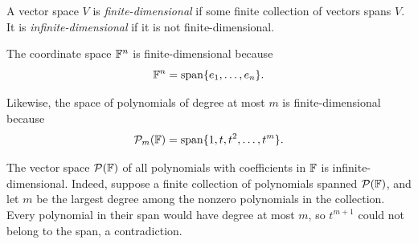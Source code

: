 \begin{definition}
  A vector space $V$ is \emph{finite-dimensional} if some finite
  collection of vectors spans $V$. It is \emph{infinite-dimensional}
  if it is not finite-dimensional.
\end{definition}

\begin{example}
  The coordinate space $\mathbb{F}^n$ is finite-dimensional because
  \[
    \mathbb{F}^n=\operatorname{span}\{e_1,\ldots,e_n\}.
  \]

  Likewise, the space of polynomials of degree at most $m$ is
  finite-dimensional because
  \[
    \mathcal P_m(\mathbb{F})
    =\operatorname{span}\{1,t,t^2,\ldots,t^m\}.
  \]
\end{example}

\begin{example}
  The vector space $\mathcal P(\mathbb{F})$ of all polynomials with
  coefficients in $\mathbb{F}$ is infinite-dimensional. Indeed, suppose a
  finite collection of polynomials spanned $\mathcal P(\mathbb{F})$, and let
  $m$ be the largest degree among the nonzero polynomials in the
  collection. Every polynomial in their span would have degree at most
  $m$, so $t^{m+1}$ could not belong to the span, a contradiction.
\end{example}

